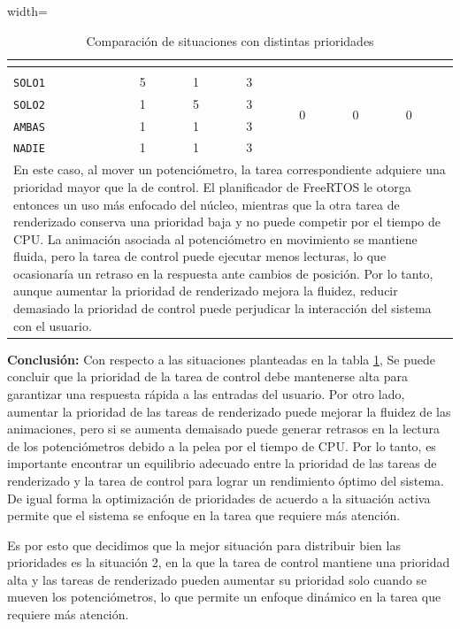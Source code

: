 \documentclass[12pt, letterpaper]{article}
\begin{document}
\begin{table}[H]
\begin{adjustbox}{width=\textwidth}
\begin{tabular}{|l|l|l|l|l|l|l|}
{        } \\
        \hline
        \rowcolor{NavyBlue!80}
        \multicolumn{7}{|c|}{\textbf{Situación 3}} \\
        \hline
        \texttt{SOLO1} & 5 & 1 & 3 & \multirow{4}{*}{0} & \multirow{4}{*}{0} & \multirow{4}{*}{0} \\
        \texttt{SOLO2} & 1 & 5 & 3 &  &  &  \\
        \texttt{AMBAS} & 1 & 1 & 3 &  &  &  \\
        \texttt{NADIE} & 1 & 1 & 3 &  &  &  \\
        \hline
        \multicolumn{7}{|p{\textwidth}|}{
            En este caso, al mover un potenciómetro, la tarea correspondiente adquiere una prioridad mayor que la de control. El planificador de FreeRTOS le otorga entonces un uso más enfocado del núcleo, mientras que la otra tarea de renderizado conserva una prioridad baja y no puede competir por el tiempo de CPU. La animación asociada al potenciómetro en movimiento se mantiene fluida, pero la tarea de control puede ejecutar menos lecturas, lo que ocasionaría un retraso en la respuesta ante cambios de posición. Por lo tanto, aunque aumentar la prioridad de renderizado mejora la fluidez, reducir demasiado la prioridad de control puede perjudicar la interacción del sistema con el usuario.
        } \\
        \hline
    \end{tabular}
\end{adjustbox}
\caption{Comparación de situaciones con distintas prioridades}
\label{tab:prioridades}
\end{table}

\textbf{Conclusión:} Con respecto a las situaciones planteadas en la tabla \ref{tab:prioridades}, Se puede concluir que la prioridad de la tarea de control debe mantenerse alta para garantizar una respuesta rápida a las entradas del usuario. Por otro lado, aumentar la prioridad de las tareas de renderizado puede mejorar la fluidez de las animaciones, pero si se aumenta demaisado puede generar retrasos en la lectura de los potenciómetros debido a la pelea por el tiempo de CPU. Por lo tanto, es importante encontrar un equilibrio adecuado entre la prioridad de las tareas de renderizado y la tarea de control para lograr un rendimiento óptimo del sistema. De igual forma la optimización de prioridades de acuerdo a la situación activa permite que el sistema se enfoque en la tarea que requiere más atención.

Es por esto que decidimos que la mejor situación para distribuir bien las prioridades es la situación 2, en la que la tarea de control mantiene una prioridad alta y las tareas de renderizado pueden aumentar su prioridad solo cuando se mueven los potenciómetros, lo que permite un enfoque dinámico en la tarea que requiere más atención.
\end{document}
